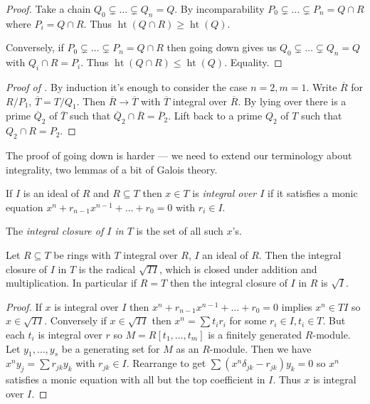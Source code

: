 \documentclass[a4paper]{article}
\DeclareMathOperator{\htt}{ht} %
\begin{document}
\begin{proof}
  Take a chain \(Q_0 \subsetneq \dots \subsetneq Q_n = Q\). By incomparability \(P_0 \subsetneq \dots \subsetneq P_n = Q \cap R\) where \(P_i = Q \cap R\). Thus \(\htt(Q \cap R) \geq \htt (Q)\).

  Conversely, if \(P_0 \subsetneq \dots \subsetneq P_n = Q \cap R\) then going down gives us \(Q_0 \subsetneq \dots \subsetneq Q_n = Q\) with \(Q_i \cap R = P_i\). Thus \(\htt(Q \cap R) \leq \htt(Q)\). Equality.
\end{proof}

\begin{proof}[Proof of ]
  By induction it's enough to consider the case \(n = 2, m = 1\). Write \(\overline R\) for \(R/P_1\), \(\overline T = T/Q_1\). Then \(\overline R \to \overline T\) with \(\overline T\) integral over \(\overline R\). By lying over there is a prime \(\overline Q_2\) of \(\overline T\) such that \(\overline Q_2 \cap \overline R = \overline P_2\). Lift back to a prime \(Q_2\) of \(T\) such that \(Q_2 \cap R = P_2\).
\end{proof}

The proof of going down is harder --- we need to extend our terminology about integrality, two lemmas of a bit of Galois theory.

\begin{definition}
  If \(I\) is an ideal of \(R\) and \(R \subseteq T\) then \(x \in T\) is \emph{integral over \(I\)} if it satisfies a monic equation \(x^n + r_{n - 1} x^{n - 1} + \dots + r_0 = 0\) with \(r_i \in I\).

  The \emph{integral closure of \(I\) in \(T\)} is the set of all such \(x\)'s.
\end{definition}

\begin{lemma}
  Let \(R \subseteq T\) be rings with \(T\) integral over \(R\), \(I\) an ideal of \(R\). Then the integral closure of \(I\) in \(T\) is the radical \(\sqrt{TI}\), which is closed under addition and multiplication. In particular if \(R = T\) then the integral closure of \(I\) in \(R\) is \(\sqrt I\).
\end{lemma}

\begin{proof}
  If \(x\) is integral over \(I\) then \(x^n + r_{n - 1} x^{n - 1} + \dots + r_0 = 0\) implies \(x^n \in TI\) so \(x \in \sqrt{TI}\). Conversely if \(x \in \sqrt{TI}\) then \(x^n = \sum t_ir_i\) for some \(r_i \in I, t_i \in T\). But each \(t_i\) is integral over \(r\) so \(M = R[t_1, \dots, t_m]\) is a finitely generated \(R\)-module. Let \(y_1, \dots, y_s\) be a generating set for \(M\) as an \(R\)-module. Then we have \(x^n y_j = \sum r_{jk} y_k\) with \(r_{jk} \in I\). Rearrange to get \(\sum (x^n \delta_{jk} - r_{jk}) y_k = 0\) so \(x^n\) satisfies a monic equation with all but the top coefficient in \(I\). Thus \(x\) is integral over \(I\).
\end{proof}
\end{document}
